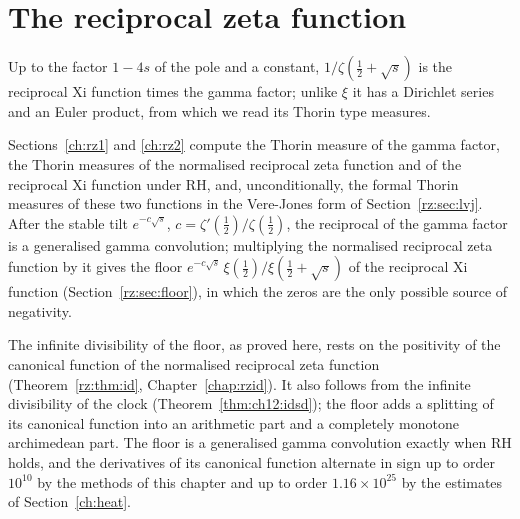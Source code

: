 \chapter{The reciprocal zeta function}\label{chap:rzeta}

Up to the factor $1-4s$ of the pole and a constant, $1/\zeta(\frac12+\sqrt s)$ is the reciprocal Xi function times the gamma factor; unlike $\xi$ it has a Dirichlet series and an Euler product, from which we read its Thorin type measures.

Sections~\ref{ch:rz1} and \ref{ch:rz2} compute the Thorin measure of the gamma factor, the Thorin measures of the normalised reciprocal zeta function and of the reciprocal Xi function under RH, and, unconditionally, the formal Thorin measures of these two functions in the Vere-Jones form of Section~\ref{rz:sec:lvj}. After the stable tilt $e^{-c\sqrt s}$, $c=\zeta'(\frac12)/\zeta(\frac12)$, the reciprocal of the gamma factor is a generalised gamma convolution; multiplying the normalised reciprocal zeta function by it gives the floor $e^{-c\sqrt s}\,\xi(\frac12)/\xi(\frac12+\sqrt s)$ of the reciprocal Xi function (Section~\ref{rz:sec:floor}), in which the zeros are the only possible source of negativity.

The infinite divisibility of the floor, as proved here, rests on the positivity of the canonical function of the normalised reciprocal zeta function (Theorem~\ref{rz:thm:id}, Chapter~\ref{chap:rzid}). It also follows from the infinite divisibility of the clock (Theorem~\ref{thm:ch12:idsd}); the floor adds a splitting of its canonical function into an arithmetic part and a completely monotone archimedean part. The floor is a generalised gamma convolution exactly when RH holds, and the derivatives of its canonical function alternate in sign up to order $10^{10}$ by the methods of this chapter and up to order $1.16\times10^{25}$ by the estimates of Section~\ref{ch:heat}.
